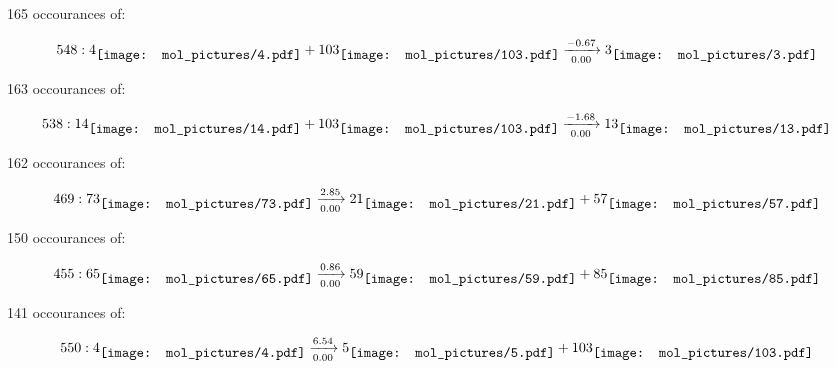 \documentclass{article}
\begin{document}
\vspace{1cm}


165 occourances of:

$$
548:  
4
\raisebox{-.5\height}{\texttt{[image: mol\_pictures/4.pdf]}}
+
103
\raisebox{-.5\height}{\texttt{[image: mol\_pictures/103.pdf]}}
\xrightarrow[0.00]{-0.67}
3
\raisebox{-.5\height}{\texttt{[image: mol\_pictures/3.pdf]}}
$$



\vspace{1cm}


163 occourances of:

$$
538:  
14
\raisebox{-.5\height}{\texttt{[image: mol\_pictures/14.pdf]}}
+
103
\raisebox{-.5\height}{\texttt{[image: mol\_pictures/103.pdf]}}
\xrightarrow[0.00]{-1.68}
13
\raisebox{-.5\height}{\texttt{[image: mol\_pictures/13.pdf]}}
$$



\vspace{1cm}


162 occourances of:

$$
469:  
73
\raisebox{-.5\height}{\texttt{[image: mol\_pictures/73.pdf]}}
\xrightarrow[0.00]{2.85}
21
\raisebox{-.5\height}{\texttt{[image: mol\_pictures/21.pdf]}}
+
57
\raisebox{-.5\height}{\texttt{[image: mol\_pictures/57.pdf]}}
$$



\vspace{1cm}


150 occourances of:

$$
455:  
65
\raisebox{-.5\height}{\texttt{[image: mol\_pictures/65.pdf]}}
\xrightarrow[0.00]{0.86}
59
\raisebox{-.5\height}{\texttt{[image: mol\_pictures/59.pdf]}}
+
85
\raisebox{-.5\height}{\texttt{[image: mol\_pictures/85.pdf]}}
$$



\vspace{1cm}


141 occourances of:

$$
550:  
4
\raisebox{-.5\height}{\texttt{[image: mol\_pictures/4.pdf]}}
\xrightarrow[0.00]{6.54}
5
\raisebox{-.5\height}{\texttt{[image: mol\_pictures/5.pdf]}}
+
103
\raisebox{-.5\height}{\texttt{[image: mol\_pictures/103.pdf]}}
$$



\vspace{1cm}
\end{document}
